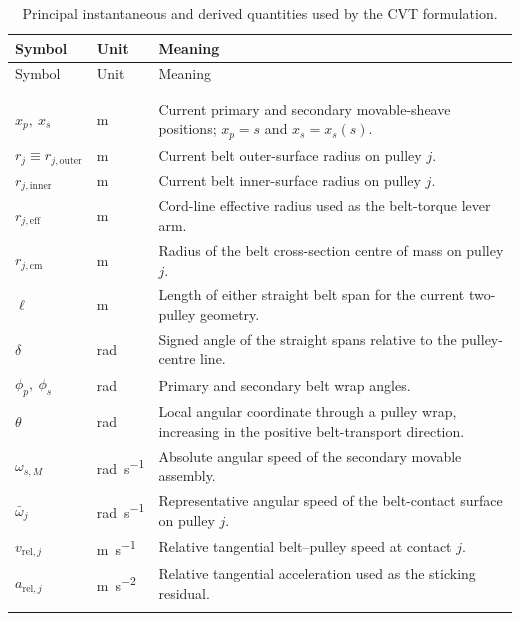 \documentclass[11pt]{report}
\numberwithin{equation}{section}
\begin{document}
\begingroup
\small
\setlength{\LTleft}{0pt}
\setlength{\LTright}{0pt}
\begin{longtable}{@{}p{}p{}p{}@{}}
\toprule
Symbol & Unit & Meaning \\ \midrule
\endfirsthead
\toprule
Symbol & Unit & Meaning \\ \midrule
\endhead
\bottomrule
\endfoot
\bottomrule
\caption{Principal instantaneous and derived quantities used by the CVT formulation.}\\
\endlastfoot

\multicolumn{3}{@{}l}{\textbf{Geometry and kinematics}} \\
$x_p,\ x_s$ & \si{\meter} & Current primary and secondary movable-sheave positions; $x_p=s$ and $x_s=x_s(s)$. \\
$r_j\equiv r_{j,\mathrm{outer}}$ & \si{\meter} & Current belt outer-surface radius on pulley $j$. \\
$r_{j,\mathrm{inner}}$ & \si{\meter} & Current belt inner-surface radius on pulley $j$. \\
$r_{j,\mathrm{eff}}$ & \si{\meter} & Cord-line effective radius used as the belt-torque lever arm. \\
$r_{j,\mathrm{cm}}$ & \si{\meter} & Radius of the belt cross-section centre of mass on pulley $j$. \\
$\ell$ & \si{\meter} & Length of either straight belt span for the current two-pulley geometry. \\
$\delta$ & \si{\radian} & Signed angle of the straight spans relative to the pulley-centre line. \\
$\phi_p,\ \phi_s$ & \si{\radian} & Primary and secondary belt wrap angles. \\
$\theta$ & \si{\radian} & Local angular coordinate through a pulley wrap, increasing in the positive belt-transport direction. \\
$\omega_{s,M}$ & \si{\radian\per\second} & Absolute angular speed of the secondary movable assembly. \\
$\bar\omega_j$ & \si{\radian\per\second} & Representative angular speed of the belt-contact surface on pulley $j$. \\
$v_{\mathrm{rel},j}$ & \si{\meter\per\second} & Relative tangential belt--pulley speed at contact $j$. \\
$a_{\mathrm{rel},j}$ & \si{\meter\per\second\squared} & Relative tangential acceleration used as the sticking residual. \\
\addlinespace


\end{longtable}
\end{document}
